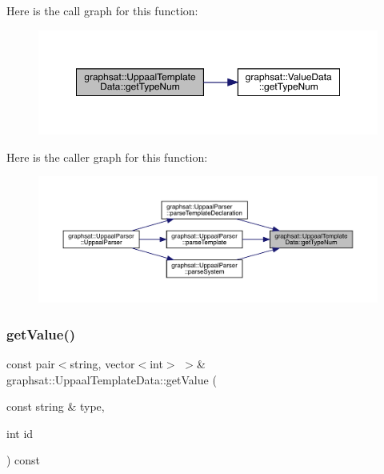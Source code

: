 Here is the call graph for this function\+:
\nopagebreak
\begin{figure}[H]
\begin{center}
\leavevmode
\includegraphics[width=350pt]{classgraphsat_1_1_uppaal_template_data_a68e36b69f936aea39f9bb0c76d7c1dc9_cgraph}
\end{center}
\end{figure}
Here is the caller graph for this function\+:
\nopagebreak
\begin{figure}[H]
\begin{center}
\leavevmode
\includegraphics[width=350pt]{classgraphsat_1_1_uppaal_template_data_a68e36b69f936aea39f9bb0c76d7c1dc9_icgraph}
\end{center}
\end{figure}
\mbox{\label{classgraphsat_1_1_uppaal_template_data_a72fc224f253fa49d0059cf81fe3f3d5d}} 
\subsubsection{\texorpdfstring{getValue()}{getValue()}\hspace{0.1cm}{\footnotesize\ttfamily [1/3]}}
{\footnotesize\ttfamily const pair$<$string, vector$<$int$>$ $>$\& graphsat\+::\+Uppaal\+Template\+Data\+::get\+Value (\begin{DoxyParamCaption}\item[{const string \&}]{type,  }\item[{int}]{id }\end{DoxyParamCaption}) const\hspace{0.3cm}{\ttfamily [inline]}}


